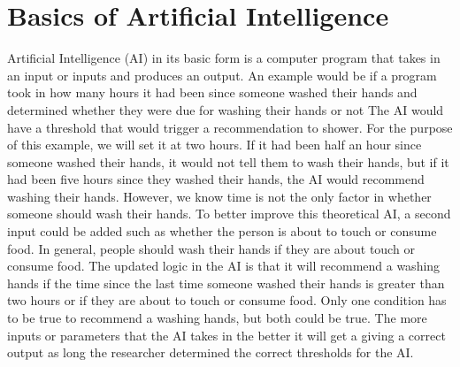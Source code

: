 \documentclass[]{article}
\begin{document}
	\section{Basics of Artificial Intelligence}\label{introtoai}
		Artificial Intelligence (AI) in its basic form is a computer program that takes in an input or inputs and produces an output.  An example would be if a program took in how many hours it had been since someone washed their hands and determined whether they were due for washing their hands or not  The AI would have a threshold that would trigger a recommendation to shower.  For the purpose of this example, we will set it at two hours.  If it had been half an hour since someone washed their hands, it would not tell them to wash their hands, but if it had been five hours since they washed their hands, the AI would recommend washing their hands.  However, we know time is not the only factor in whether someone should wash their hands.  To better improve this theoretical AI, a second input could be added such as whether the person is about to touch or consume food.  In general, people should wash their hands if they are about touch or consume food.  The updated logic in the AI is that it will recommend a washing hands if the time since the last time someone washed their hands is greater than two hours or if they are about to touch or consume food. Only one condition has to be true to recommend a washing hands, but both could be true.  The more inputs or parameters that the AI takes in the better it will get a giving a correct output as long the researcher determined the correct thresholds for the AI.
\end{document}
